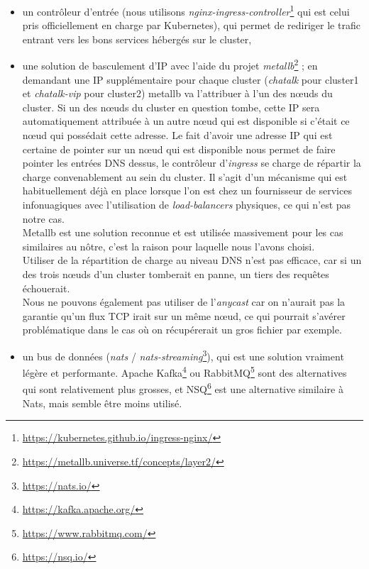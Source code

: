 \begin{itemize}
\item
  un contrôleur d'entrée (nous utilisons
  \textit{nginx-ingress-controller}\footnote{
    \url{https://kubernetes.github.io/ingress-nginx/}}
  qui est celui pris officiellement en charge par Kubernetes), qui
  permet de rediriger le trafic entrant vers les bons services hébergés
  sur le cluster,
\item
  une solution de basculement d'IP avec l'aide du projet
  \textit{metallb}\footnote{
    \url{https://metallb.universe.tf/concepts/layer2/}}
  ; en demandant une IP supplémentaire pour chaque cluster
  (\textit{chatalk} pour cluster1 et \textit{chatalk-vip} pour cluster2)
  metallb va l'attribuer à l'un des nœuds du cluster. Si un des nœuds du
  cluster en question tombe, cette IP sera automatiquement attribuée à
  un autre nœud qui est disponible si c'était ce nœud qui possédait
  cette adresse. Le fait d'avoir une adresse IP qui est certaine de
  pointer sur un nœud qui est disponible nous permet de faire pointer
  les entrées DNS dessus, le contrôleur d'\textit{ingress} se charge de
  répartir la charge convenablement au sein du cluster. Il s'agit d'un
  mécanisme qui est habituellement déjà en place lorsque l'on est chez
  un fournisseur de services infonuagiques avec l'utilisation de
  \textit{load-balancers} physiques, ce qui n'est pas notre cas.\\
  Metallb est une solution reconnue et est utilisée massivement pour les
  cas similaires au nôtre, c'est la raison pour laquelle nous l'avons
  choisi.\\
  Utiliser de la répartition de charge au niveau DNS n'est pas efficace,
  car si un des trois nœuds d'un cluster tomberait en panne, un tiers
  des requêtes échouerait.\\
  Nous ne pouvons également pas utiliser de l'\textit{anycast} car on
  n'aurait pas la garantie qu'un flux TCP irait sur un même nœud, ce qui
  pourrait s'avérer problématique dans le cas où on récupérerait un gros
  fichier par exemple.
\item
  un bus de données (\textit{nats} /
  \textit{nats-streaming}\footnote{\url{https://nats.io/}}), qui est une
  solution vraiment légère et performante. Apache
  Kafka\footnote{\url{https://kafka.apache.org/}} ou
  RabbitMQ\footnote{\url{https://www.rabbitmq.com/}}
  sont des alternatives qui sont relativement plus grosses, et
  NSQ\footnote{\url{https://nsq.io/}} est une alternative
  similaire à Nats, mais semble être moins utilisé.\\

\end{itemize}
